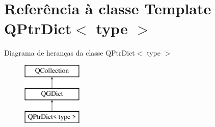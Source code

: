 \hypertarget{class_q_ptr_dict}{\section{Referência à classe Template Q\-Ptr\-Dict$<$ type $>$}
\label{class_q_ptr_dict}
}
Diagrama de heranças da classe Q\-Ptr\-Dict$<$ type $>$\begin{figure}[H]
\begin{center}
\leavevmode
\includegraphics[height=3.000000cm]{class_q_ptr_dict}
\end{center}
\end{figure}
